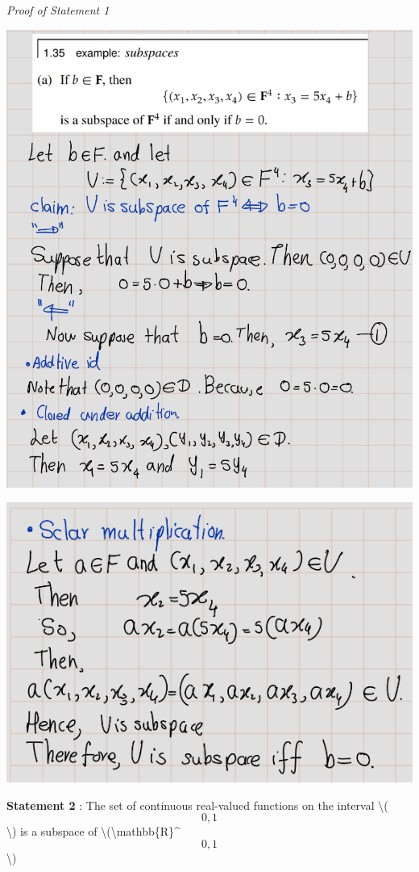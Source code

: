 \documentclass[
]{book}
\theoremstyle{definition}
\theoremstyle{definition}
\theoremstyle{definition}
\theoremstyle{definition}
\theoremstyle{remark}
\begin{document}
\emph{Proof of Statement 1}

\includegraphics{fig/Ex1C/Ex2-a-1.png}

\includegraphics{fig/Ex1C/Ex2-a-2.png}

\textbf{Statement 2} : The set of continuous real-valued functions on the interval \textbackslash(\[0, 1\]\textbackslash) is a subspace of \textbackslash(\textbackslash mathbb\{R\}\^{}\[0,1\]\textbackslash)
\end{document}
